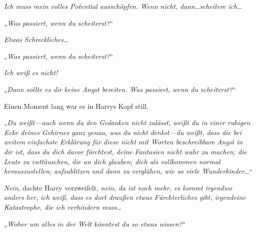 \emph{Ich muss mein volles Potential ausschöpfen. Wenn nicht, dann…scheitere ich…}

„\emph{Was passiert, wenn du scheiterst?}“

\emph{Etwas Schreckliches…}

„\emph{Was passiert, wenn du scheiterst?}“

\emph{Ich weiß es nicht! }

„\emph{Dann sollte es dir keine Angst bereiten. Was passiert, wenn du scheiterst?}“


Einen Moment lang war es in Harrys Kopf still.

„\emph{Du weißt—auch wenn du den Gedanken nicht zulässt, weißt du in einer ruhigen Ecke deines Gehirnes ganz genau, was du nicht denkst—du \emph{weißt}, dass die bei weitem einfachste Erklärung für diese nicht mit Worten beschreibbare Angst in dir ist, dass du dich davor fürchtest, deine Fantasien nicht wahr zu machen; die Leute zu enttäuschen, die an dich glauben; dich als vollkommen normal herauszustellen; aufzublitzen und dann zu verglühen, wie so viele Wunderkinder…}“

\emph{Nein}, dachte Harry verzweifelt, \emph{nein, da ist noch mehr, es kommt irgendwo anders her, ich weiß, dass es dort draußen etwas Fürchterliches gibt, irgendeine Katastrophe, die ich verhindern muss…}

„\emph{Woher um alles in der Welt könntest du so etwas wissen?}“

